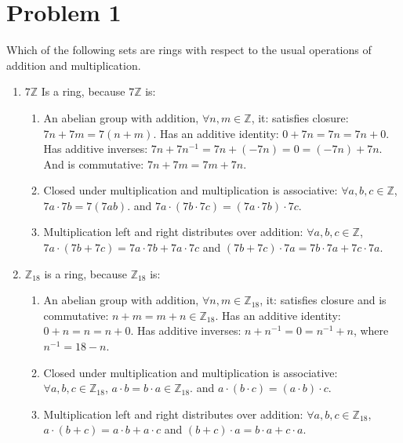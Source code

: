 \documentclass[12pt]{article}
\title{\scalebox{2}{Math 431 Homework 4}}
\author{\scalebox{1.5}{Theo Koss}}
\date{October 2020}
\newcommand{\Z}{\mathbb{Z}}
\begin{document}
\maketitle
\section{Problem 1}
Which of the following sets are rings with respect to the usual operations of addition and multiplication.
\begin{enumerate}
    \item $7\Z$ Is a ring, because $7\Z$ is: \begin{enumerate}
        \item An abelian group with addition, $\forall n,m\in\Z$, it: \newline satisfies closure: $7n+7m=7(n+m)$. \newline Has an additive identity: $0+7n=7n=7n+0$. \newline Has additive inverses: $7n+7n^{-1}=7n+(-7n)=0=(-7n)+7n$. \newline And is commutative: $7n+7m=7m+7n$.
        \item Closed under multiplication and multiplication is associative: \newline $\forall a,b,c\in\Z$, $7a\cdot7b=7(7ab)$. and  $7a\cdot(7b\cdot7c)=(7a\cdot7b)\cdot7c$.
        \item Multiplication left and right distributes over addition: \newline $\forall a,b,c\in\Z$, $7a\cdot(7b+7c)=7a\cdot7b+7a\cdot7c$ and $(7b+7c)\cdot7a=7b\cdot7a+7c\cdot7a$.
    \end{enumerate}
    \item $\Z_{18}$ is a ring, because $\Z_{18}$ is: \begin{enumerate}
        \item An abelian group with addition, $\forall n,m\in\Z_{18}$, it: \newline satisfies closure and is commutative: $n+m=m+n\in\Z_{18}$. \newline Has an additive identity: $0+n=n=n+0$. \newline Has additive inverses: $n+n^{-1}=0=n^{-1}+n$, where $n^{-1}=18-n$.
        \item Closed under multiplication and multiplication is associative: $\forall a,b,c\in\Z_{18}$, $a\cdot b=b\cdot a\in\Z_{18}$. and $a\cdot(b\cdot c)=(a\cdot b)\cdot c$.
        \item Multiplication left and right distributes over addition: $\forall a,b,c\in\Z_{18}$, $a\cdot(b+c)=a\cdot b+a\cdot c$ and $(b+c)\cdot a=b\cdot a+c\cdot a$.

\end{enumerate}
\end{enumerate}
\end{document}

